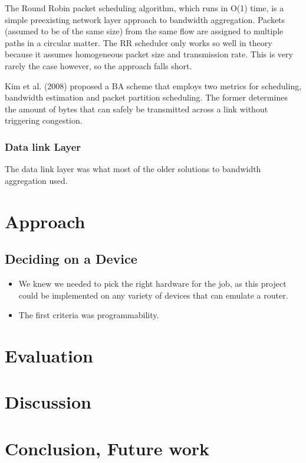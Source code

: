 \documentclass[12pt]{article}
\begin{document}
			The Round Robin packet scheduling algorithm, which runs in O(1) time, is a simple preexisting network layer approach to bandwidth aggregation. Packets (assumed to be of the same size) from the same flow are assigned to multiple paths in a circular matter. The RR scheduler only works so well in theory because it assumes homogeneous packet size and transmission rate. This is very rarely the case however, so the approach falls short.

			Kim et al. (2008) proposed a BA scheme that employs two metrics for scheduling, bandwidth estimation and packet partition scheduling. The former determines the amount of bytes that can safely be transmitted across a link without triggering congestion. 

		\subsubsection{Data link Layer}
			The data link layer was what most of the older solutions to bandwidth aggregation used.

\section{Approach}

	\subsection{Deciding on a Device}
		\begin{itemize}
			\item We knew we needed to pick the right hardware for the job, as this project could be implemented on any variety of devices that can emulate a router.
			\item The first criteria was programmability.
		\end{itemize}

\section{Evaluation}


\section{Discussion}


\section{Conclusion, Future work}


\listoftodos
\end{document}
